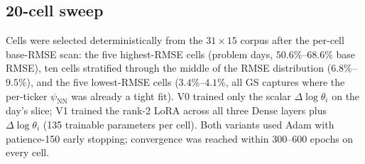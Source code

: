 \subsection{20-cell sweep}\label{sec:supp_lora_sweep}

Cells were selected deterministically from the $31 \times 15$ corpus after the per-cell base-RMSE scan: the five highest-RMSE cells (problem days, $50.6\%$--$68.6\%$ base RMSE), ten cells stratified through the middle of the RMSE distribution ($6.8\%$--$9.5\%$), and the five lowest-RMSE cells ($3.4\%$--$4.1\%$, all GS captures where the per-ticker $\psi_{\text{NN}}$ was already a tight fit). V0 trained only the scalar $\Delta\log\theta_i$ on the day's slice; V1 trained the rank-2 LoRA across all three Dense layers plus $\Delta\log\theta_i$ (135 trainable parameters per cell). Both variants used Adam with patience-150 early stopping; convergence was reached within 300--600 epochs on every cell.

